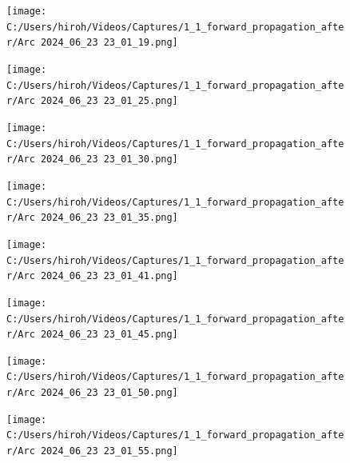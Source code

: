 \documentclass{ltjsarticle}
\begin{document}
\begin{figure}[htbp]
  \centering
  \texttt{[image: C:/Users/hiroh/Videos/Captures/1\_1\_forward\_propagation\_after/Arc 2024\_06\_23 23\_01\_19.png]}
\end{figure}
\begin{figure}[htbp]
  \centering
  \texttt{[image: C:/Users/hiroh/Videos/Captures/1\_1\_forward\_propagation\_after/Arc 2024\_06\_23 23\_01\_25.png]}
\end{figure}
\begin{figure}[htbp]
  \centering
  \texttt{[image: C:/Users/hiroh/Videos/Captures/1\_1\_forward\_propagation\_after/Arc 2024\_06\_23 23\_01\_30.png]}
\end{figure}
\begin{figure}[htbp]
  \centering
  \texttt{[image: C:/Users/hiroh/Videos/Captures/1\_1\_forward\_propagation\_after/Arc 2024\_06\_23 23\_01\_35.png]}
\end{figure}
\begin{figure}[htbp]
  \centering
  \texttt{[image: C:/Users/hiroh/Videos/Captures/1\_1\_forward\_propagation\_after/Arc 2024\_06\_23 23\_01\_41.png]}
\end{figure}
\begin{figure}[htbp]
  \centering
  \texttt{[image: C:/Users/hiroh/Videos/Captures/1\_1\_forward\_propagation\_after/Arc 2024\_06\_23 23\_01\_45.png]}
\end{figure}
\begin{figure}[htbp]
  \centering
  \texttt{[image: C:/Users/hiroh/Videos/Captures/1\_1\_forward\_propagation\_after/Arc 2024\_06\_23 23\_01\_50.png]}
\end{figure}
\begin{figure}[htbp]
  \centering
  \texttt{[image: C:/Users/hiroh/Videos/Captures/1\_1\_forward\_propagation\_after/Arc 2024\_06\_23 23\_01\_55.png]}
\end{figure}

\newpage
\end{document}
